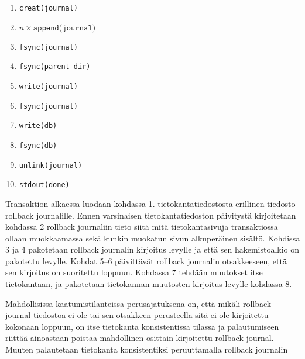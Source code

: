 \begin{enumerate}
    \item{\texttt{creat(journal)}}
    \item{$n \times \texttt{append(journal)}$}
    \item{\texttt{fsync(journal)}}
    \item{\texttt{fsync(parent-dir)}}
    \item{\texttt{write(journal)}}
    \item{\texttt{fsync(journal)}}
    \item{\texttt{write(db)}}
    \item{\texttt{fsync(db)}}
    \item{\texttt{unlink(journal)}}
    \item{\texttt{stdout(done)}}
\end{enumerate}

Transaktion alkaessa luodaan kohdassa 1. tietokantatiedostosta erillinen tiedosto rollback journalille.
Ennen varsinaisen tietokantatiedoston päivitystä kirjoitetaan kohdassa 2 rollback journaliin tieto siitä mitä tietokantasivuja transaktiossa ollaan muokkaamassa sekä kunkin muokatun sivun alkuperäinen sisältö.
Kohdissa 3 ja 4 pakotetaan rollback journalin kirjoitus levylle ja että sen hakemistoalkio on pakotettu levylle.
Kohdat 5--6 päivittävät rollback journalin otsakkeeseen, että sen kirjoitus on suoritettu loppuun.
Kohdassa 7 tehdään muutokset itse tietokantaan, ja pakotetaan tietokannan muutosten kirjoitus levylle kohdassa 8.

Mahdollisissa kaatumistilanteissa perusajatuksena on,
että mikäli rollback journal-tiedostoa ei ole tai sen otsakkeen perusteella sitä ei ole kirjoitettu kokonaan loppuun,
on itse tietokanta konsistentissa tilassa ja palautumiseen riittää ainoastaan poistaa mahdollinen osittain kirjoitettu rollback journal.
Muuten palautetaan tietokanta konsistentiksi peruuttamalla rollback journalin 

